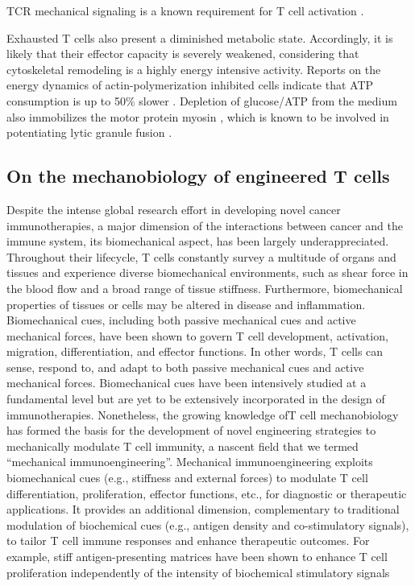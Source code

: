 TCR mechanical signaling is a known requirement for T cell activation \cite{Hu2016}.

Exhausted T cells also present a diminished metabolic state. Accordingly, it is likely that their effector capacity is severely weakened, considering that cytoskeletal remodeling is a highly energy intensive activity. Reports on the energy dynamics of actin-polymerization inhibited cells indicate that ATP consumption is up to 50\% slower \cite{Bernstein2002, Ahmed2015}. Depletion of glucose/ATP from the medium also immobilizes the motor protein myosin \cite{Xu2014}, which is known to be involved in potentiating lytic granule fusion \cite{Basu2016}.

\subsection{On the mechanobiology of engineered T cells}

Despite the intense global research effort in developing novel cancer immunotherapies, a major dimension of the interactions between cancer and the immune system, its biomechanical aspect, has been largely underappreciated. Throughout their lifecycle, T cells constantly survey a multitude of organs and tissues and experience diverse biomechanical environments, such as shear force in the blood flow and a broad range of tissue stiffness. Furthermore, biomechanical properties of tissues or cells may be altered in disease and inflammation. Biomechanical cues, including both passive mechanical cues and active mechanical forces, have been shown to govern T cell development, activation, migration, differentiation, and effector functions. In other words, T cells can sense, respond to, and adapt to both passive mechanical cues and active mechanical forces. Biomechanical cues have been intensively studied at a fundamental level but are yet to be extensively incorporated in the design of immunotherapies. Nonetheless, the growing knowledge ofT cell mechanobiology has formed the basis for the development of novel engineering strategies to mechanically modulate T cell immunity, a nascent field that we termed “mechanical immunoengineering”. Mechanical immunoengineering exploits biomechanical cues (e.g., stiffness and external forces) to modulate T cell differentiation, proliferation, effector functions, etc., for diagnostic or therapeutic applications. It provides an additional dimension, complementary to traditional modulation of biochemical cues (e.g., antigen density and co-stimulatory signals), to tailor T cell immune responses and enhance therapeutic outcomes. For example, stiff antigen-presenting matrices have been shown to enhance T cell proliferation independently of the intensity of biochemical stimulatory signals \cite{Lei2020}

